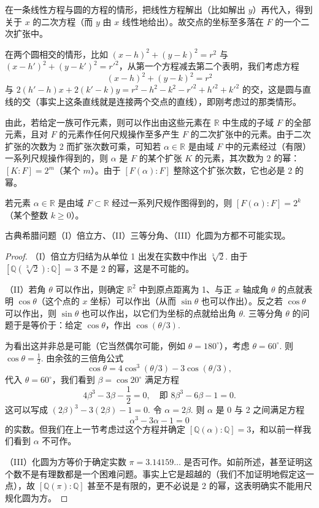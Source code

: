 在一条线性方程与圆的方程的情形，把线性方程解出（比如解出 \(y\)）再代入，得到关于 \(x\) 的二次方程（而 \(y\) 由 \(x\) 线性地给出）。故交点的坐标至多落在 \(F\) 的一个二次扩张中。

在两个圆相交的情形，比如 \((x-h)^2+(y-k)^2 = r^2\) 与 \((x-h')^2+(y-k')^2 = r'^2\)，从第一个方程减去第二个表明，我们考虑方程
\[
(x-h)^2+(y-k)^2 = r^2
\]
与 \(2(h'-h)x+2(k'-k)y = r^2-h^2-k^2-r'^2+h'^2+k'^2\) 的交，这是圆与直线的交（事实上这条直线就是连接两个交点的直线），即刚考虑过的那类情形。

由此，若给定一族可作元素，则可以作出由这些元素在 \(\mathbb{R}\) 中生成的子域 \(F\) 的全部元素，且对 \(F\) 的元素作任何尺规操作至多产生 \(F\) 的二次扩张中的元素。由于二次扩张的次数为 2 而扩张次数可乘，可知若 \(\alpha \in \mathbb{R}\) 是由域 \(F\) 中的元素经过（有限）一系列尺规操作得到的，则 \(\alpha\) 是 \(F\) 的某个扩张 \(K\) 的元素，其次数为 2 的幂：\([K:F] = 2^m\)（某个 \(m\)）。由于 \([F(\alpha):F]\) 整除这个扩张次数，它也必是 2 的幂。

\begin{proposition}\label{pro:13.23}
若元素 \(\alpha \in \mathbb{R}\) 是由域 \(F \subset \mathbb{R}\) 经过一系列尺规作图得到的，则 \([F(\alpha):F] = 2^k\)（某个整数 \(k \geq 0\)）。
\end{proposition}

\begin{theorem}\label{thm:13.24}
古典希腊问题（I）倍立方、（II）三等分角、（III）化圆为方都不可能实现。
\end{theorem}

\begin{proof}
（I）倍立方归结为从单位 1 出发在实数中作出 \(\sqrt[3]{2}\). 由于 \([\mathbb{Q}(\sqrt[3]{2}):\mathbb{Q}] = 3\) 不是 2 的幂，这是不可能的。

（II）若角 \(\theta\) 可以作出，则确定 \(\mathbb{R}^2\) 中到原点距离为 1、与正 \(x\) 轴成角 \(\theta\) 的点就表明 \(\cos\theta\)（这个点的 \(x\) 坐标）可以作出（从而 \(\sin\theta\) 也可以作出）。反之若 \(\cos\theta\) 可以作出，则 \(\sin\theta\) 也可以作出，以它们为坐标的点就给出角 \(\theta\). 三等分角 \(\theta\) 的问题于是等价于：给定 \(\cos\theta\)，作出 \(\cos(\theta/3)\).

为看出这并非总是可能（它当然偶尔可能，例如 \(\theta = 180^\circ\)），考虑 \(\theta = 60^\circ\). 则 \(\cos\theta = \frac{1}{2}\). 由余弦的三倍角公式
\[
\cos\theta = 4\cos^3(\theta/3)-3\cos(\theta/3),
\]
代入 \(\theta = 60^\circ\)，我们看到 \(\beta = \cos 20^\circ\) 满足方程
\[
4\beta^3-3\beta-\frac{1}{2} = 0, \quad \text{即 } 8\beta^3-6\beta-1 = 0.
\]
这可以写成 \((2\beta)^3-3(2\beta)-1 = 0\). 令 \(\alpha = 2\beta\). 则 \(\alpha\) 是 0 与 2 之间满足方程
\[
\alpha^3-3\alpha-1 = 0
\]
的实数。但我们在上一节考虑过这个方程并确定 \([\mathbb{Q}(\alpha):\mathbb{Q}] = 3\)，和以前一样我们看到 \(\alpha\) 不可作。

（III）化圆为方等价于确定实数 \(\pi = 3.14159\ldots\) 是否可作。如前所述，甚至证明这个数不是有理数都是一个困难问题。事实上它是超越的（我们不加证明地假定这一点），故 \([\mathbb{Q}(\pi):\mathbb{Q}]\) 甚至不是有限的，更不必说是 2 的幂，这表明确实不能用尺规化圆为方。
\end{proof}


